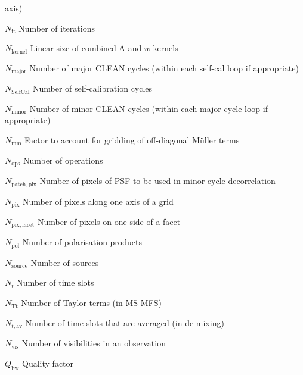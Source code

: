 \documentclass[11pt,a4paper]{article}
\newcommand{\nit}{N_\mathrm{it}} %
\newcommand{\nawkern}{N_\mathrm{kernel}} %
\newcommand{\nmaj}{N_\mathrm{major}} %
\newcommand{\nmin}{N_\mathrm{minor}} %
\newcommand{\nselfcal}{N_\mathrm{SelfCal}} %
\newcommand{\facgridoffdiagmuller}{N_\mathrm{mm}} %
\newcommand{\nops}{N_\mathrm{ops}} %
\newcommand{\npatchpix}{N_\mathrm{patch,pix}} %
\newcommand{\npix}{N_\mathrm{pix}} %
\newcommand{\npixfacet}{N_\mathrm{pix,facet}} %
\newcommand{\npol}{N_\mathrm{pol}} %
\newcommand{\ntslot}{N_t} %
\newcommand{\ntaylor}{N_\mathrm{Tt}} %
\newcommand{\ntslotave}{N_{t,\mathrm{av}}} %
\newcommand{\nvis}{N_\mathrm{vis}} %
\newcommand{\qfacbw}{Q_\mathrm{bw}} %
\newcommand{\nsource}{N_\mathrm{source}} %
\newcommand{\w}{w} %
\begin{document}
\begin{basedescript}{\desclabelstyle{\pushlabel}\desclabelwidth{6em}}
  axis) \vspace{-0.2cm}
\item[$\nit$] Number of iterations \vspace{-0.2cm}
\item[$\nawkern$] Linear size of combined A and $\w$-kernels \vspace{-0.2cm}
\item[$\nmaj$] Number of major CLEAN cycles (within each self-cal loop if appropriate) \vspace{-0.2cm}
\item[$\nselfcal$] Number of self-calibration cycles \vspace{-0.2cm}
\item[$\nmin$] Number of minor CLEAN cycles (within each major cycle loop if appropriate)\vspace{-0.2cm}
\item[$\facgridoffdiagmuller$] Factor to account for gridding of off-diagonal
  M\"uller terms \vspace{-0.2cm}
\item[$\nops$] Number of operations \vspace{-0.2cm}
\item[$\npatchpix$] Number of pixels of PSF to be used in minor cycle
  decorrelation \vspace{-0.2cm}
\item[$\npix$] Number of pixels along one axis of a grid\vspace{-0.2cm}
\item[$\npixfacet$] Number of pixels on one side of a facet \vspace{-0.2cm}
\item[$\npol$] Number of polarisation products \vspace{-0.2cm}
\item[$\nsource$] Number of sources \vspace{-0.2cm}
\item[$\ntslot$] Number of time slots \vspace{-0.2cm}
\item[$\ntaylor$] Number of Taylor terms (in MS-MFS)\vspace{-0.2cm}
\item[$\ntslotave$] Number of time slots that are averaged (in de-mixing)
  \vspace{-0.2cm}
\item[$\nvis$] Number of visibilities in an observation \vspace{-0.2cm}
\item[$\qfacbw$] Quality factor \vspace{-0.2cm}

\end{basedescript}
\end{document}
